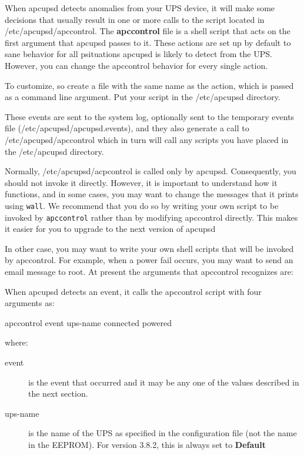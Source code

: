 {{{{{{{{\label{index-Event-handling-150}
\label{index-Customizing-event-handling-151}

When apcupsd detects anomalies from your UPS device, it will make some
decisions that usually result in one or more calls to the script located in
/etc/apcupsd/apccontrol. The {\bf apccontrol} file is a shell script that acts
on the first argument that apcupsd passes to it. These actions are set up by
default to sane behavior for all psituations apcupsd is likely to detect from
the UPS. However, you can change the apccontrol behavior for every single
action.  

To customize, so create a file with the same name as the action, which is
passed as a command line argument. Put your script in the /etc/apcupsd
directory.  

These events are sent to the system log, optionally sent to the temporary
events file (/etc/apcupsd/apcupsd.events), and they also generate a call to
/etc/apcupsd/apccontrol which in turn will call any scripts you have placed in
the /etc/apcupsd directory.  

Normally, /etc/apcupsd/acpcontrol is called only by apcupsd. Consequently, you
should not invoke it directly.  However, it is important to understand how it
functions, and in some cases, you may want to change the messages that it
prints using {\tt wall}. We recommend that you do so by writing your own
script to be invoked by {\tt apccontrol} rather than by modifying apccontrol
directly. This makes it easier for you to upgrade to the next version of
apcupsd  

In other case, you may want to write your own shell scripts that will be
invoked by apccontrol. For example, when a power fail occurs, you may want to
send an email message to root. At present the arguments that apccontrol
recognizes are:  

When apcupsd detects an event, it calls the apccontrol script with four
arguments as:  

apccontrol \lt{}event\gt{} \lt{}ups-name\gt{} \lt{}connected\gt{}
\lt{}powered\gt{}  

where:  

\begin{description}

\item [event]
   is the event that occurred and it may be any one of the values described in
the next section.  

\item [ups-name]
   is the name of the UPS as specified in the configuration file (not the name in
the EEPROM). For version 3.8.2, this is always set to {\bf Default}  


\end{description}}}}}}}}}
